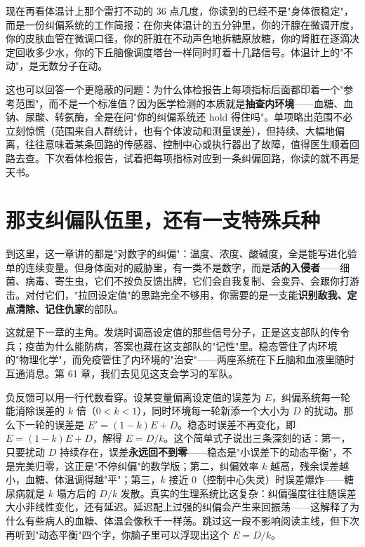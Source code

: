 现在再看体温计上那个雷打不动的 $36$ 点几度，你读到的已经不是"身体很稳定"，而是一份纠偏系统的工作简报：在你夹体温计的五分钟里，你的汗腺在微调开度，你的皮肤血管在微调口径，你的肝脏在不动声色地拆糖原放糖，你的肾脏在逐滴决定回收多少水，你的下丘脑像调度塔台一样同时盯着十几路信号。体温计上的"不动"，是无数分子在动。

这也可以回答一个更隐蔽的问题：为什么体检报告上每项指标后面都印着一个"参考范围"，而不是一个标准值？因为医学检测的本质就是\textbf{抽查内环境}——血糖、血钠、尿酸、转氨酶，全是在问"你的纠偏系统还 hold 得住吗"。单项略出范围不必立刻惊慌（范围来自人群统计，也有个体波动和测量误差），但持续、大幅地偏离，往往意味着某条回路的传感器、控制中心或执行器出了故障，值得医生顺着回路去查。下次看体检报告，试着把每项指标对应到一条纠偏回路，你读的就不再是天书。

\section{那支纠偏队伍里，还有一支特殊兵种}

到这里，这一章讲的都是"对数字的纠偏"：温度、浓度、酸碱度，全是能写进化验单的连续变量。但身体面对的威胁里，有一类不是数字，而是\textbf{活的入侵者}——细菌、病毒、寄生虫，它们不按负反馈出牌，它们会自我复制、会变异、会跟你打游击。对付它们，"拉回设定值"的思路完全不够用，你需要的是一支能\textbf{识别敌我、定点清除、记住仇家}的部队。

这就是下一章的主角。发烧时调高设定值的那些信号分子，正是这支部队的传令兵；疫苗为什么能防病，答案也藏在这支部队的"记性"里。稳态管住了内环境的"物理化学"，而免疫管住了内环境的"治安"——两座系统在下丘脑和血液里随时互通消息。第 61 章，我们去见见这支会学习的军队。

\begin{tiaozhan}
负反馈可以用一行代数看穿。设某变量偏离设定值的误差为 $E$，纠偏系统每一轮能消除误差的 $k$ 倍（$0<k<1$），同时环境每一轮新添一个大小为 $D$ 的扰动。那么下一轮的误差是 $E' = (1-k)E + D$。稳态时误差不再变化，即 $E = (1-k)E + D$，解得 $E = D/k$。这个简单式子说出三条深刻的话：第一，只要扰动 $D$ 持续存在，误差\textbf{永远回不到零}——稳态是"小误差下的动态平衡"，不是完美归零，这正是"不停纠偏"的数学版；第二，纠偏效率 $k$ 越高，残余误差越小，血糖、体温调得越"平"；第三，$k$ 接近 $0$（控制中心失灵）时误差爆炸——糖尿病就是 $k$ 塌方后的 $D/k$ 发散。真实的生理系统比这复杂：纠偏强度往往随误差大小非线性变化，还有延迟。延迟配上过强的纠偏会产生来回振荡——这解释了为什么有些病人的血糖、体温会像秋千一样荡。跳过这一段不影响阅读主线，但下次再听到"动态平衡"四个字，你脑子里可以浮现出这个 $E=D/k$。
\end{tiaozhan}

